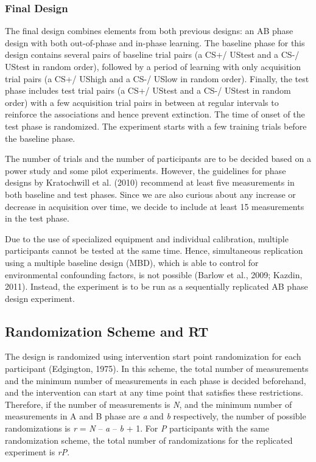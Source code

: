 \documentclass{article}
\begin{document}
\subsubsection{Final Design}

The final design combines elements from both previous designs: an AB phase design with both out-of-phase and in-phase learning. The baseline phase for this design contains several pairs of baseline trial pairs (a CS+/ UStest and a CS-/ UStest in random order), followed by a period of learning with only acquisition trial pairs (a CS+/ UShigh and a CS-/ USlow in random order). Finally, the test phase includes test trial pairs (a CS+/ UStest and a CS-/ UStest in random order) with a few acquisition trial pairs in between at regular intervals to reinforce the associations and hence prevent extinction. The time of onset of the test phase is randomized. The experiment starts with a few training trials before the baseline phase. 

The number of trials and the number of participants are to be decided based on a power study and some pilot experiments. However, the guidelines for phase designs by Kratochwill et al. (2010) recommend at least five measurements in both baseline and test phases. Since we are also curious about any increase or decrease in acquisition over time, we decide to include at least 15 measurements in the test phase. 

Due to the use of specialized equipment and individual calibration, multiple participants cannot be tested at the same time. Hence, simultaneous replication using a multiple baseline design (MBD), which is able to control for environmental confounding factors, is not possible (Barlow et al., 2009; Kazdin, 2011). Instead, the experiment is to be run as a sequentially replicated AB phase design experiment. 

\subsection{Randomization Scheme and RT}

The design is randomized using intervention start point randomization for each participant (Edgington, 1975). In this scheme, the total number of measurements and the minimum number of measurements in each phase is decided beforehand, and the intervention can start at any time point that satisfies these restrictions. Therefore, if the number of measurements is \emph{N}, and the minimum number of measurements in A and B phase are \emph{a} and \emph{b} respectively, the number of possible randomizations is \emph{r} = \emph{N} -- \emph{a} -- \emph{b} + 1. For \emph{P} participants with the same randomization scheme, the total number of randomizations for the replicated experiment is \emph{r}\emph{P}. 
\end{document}
